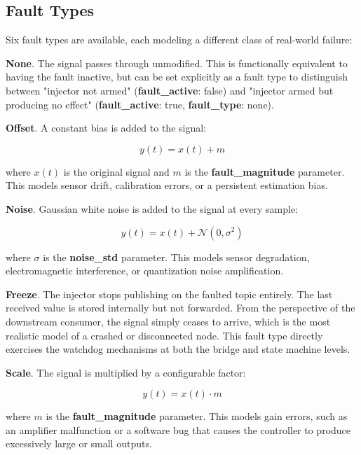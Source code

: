 \subsection{Fault Types}
Six fault types are available, each modeling a different class of real-world failure:

\textbf{None}. The signal passes through unmodified. This is functionally equivalent to having the fault inactive, but can be set explicitly as a fault type to distinguish between "injector not armed" (\textbf{fault\_active}: false) and "injector armed but producing no effect" (\textbf{fault\_active}: true, \textbf{fault\_type}: none).

\textbf{Offset}. A constant bias is added to the signal:

\begin{equation}
y(t) = x(t) + m
\end{equation}

where $x(t)$ is the original signal and $m$ is the \textbf{fault\_magnitude} parameter. This models sensor drift, calibration errors, or a persistent estimation bias.

\textbf{Noise}. Gaussian white noise is added to the signal at every sample:

\begin{equation}
    y(t) = x(t) + \mathcal{N}(0, \sigma^2)
\end{equation}

where $\sigma$ is the \textbf{noise\_std} parameter. This models sensor degradation, electromagnetic interference, or quantization noise amplification.

\textbf{Freeze}. The injector stops publishing on the faulted topic entirely. The last received value is stored internally but not forwarded. From the perspective of the downstream consumer, the signal simply ceases to arrive, which is the most realistic model of a crashed or disconnected node. This fault type directly exercises the watchdog mechanisms at both the bridge and state machine levels.

\textbf{Scale}. The signal is multiplied by a configurable factor:

\begin{equation}
    y(t) = x(t) \cdot m
\end{equation}

where $m$ is the \textbf{fault\_magnitude} parameter. This models gain errors, such as an amplifier malfunction or a software bug that causes the controller to produce excessively large or small outputs.

